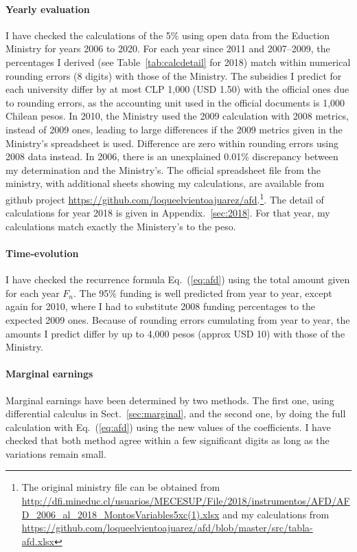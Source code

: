\documentclass[twocolumn]{article}
\def\eqref#1{Eq.~(\ref{eq:#1})}
\begin{document}
\paragraph{Yearly evaluation} I have checked the calculations of the 5\% using open data from the Eduction Ministry for
years 2006 to 2020. For each year since 2011 and 2007--2009, the percentages I
derived (see Table~\ref{tab:calcdetail} for 2018) match within numerical
rounding errors (8 digits) with those of the Ministry. The subsidies I predict
for each university differ by at most CLP 1,000 (USD 1.50) with the
official ones due to rounding errors, as the accounting unit used in the
official documents is 1,000 Chilean pesos. In 2010, the Ministry used the 2009
calculation with 2008 metrics, instead of 2009 ones, leading to large differences if the 2009 metrics given in the Ministry's spreadsheet is used.  Difference are zero within rounding errors using 2008 data instead. In 2006, there is an unexplained 0.01\% discrepancy between my determination and the Ministry's.  The official spreadsheet file from the ministry, with additional sheets showing my calculations, are available from github project \url{https://github.com/loqueelvientoajuarez/afd}.\footnote{The original ministry file can
be obtained from \url{http://dfi.mineduc.cl/usuarios/MECESUP/File/2018/instrumentos/AFD/AFD_2006_al_2018_MontosVariables5xc(1).xlsx} and my calculations from \url{https://github.com/loqueelvientoajuarez/afd/blob/master/src/tabla-afd.xlsx}}. 
The detail of calculations for year 2018 is given in Appendix.~\ref{sec:2018}.
For that year, my calculations match exactly the Ministery's to the peso.

\paragraph{Time-evolution} I have checked the recurrence formula \eqref{afd} using the total amount given for each year $F_n$.  The 95\% funding is well predicted from year to year, except again for 2010, where I had to substitute 2008 funding percentages to the expected 2009 ones. Because of rounding errors cumulating from year to year, the amounts I predict differ by up to 4,000 pesos (approx USD 10) with those of the Ministry.

\paragraph{Marginal earnings}  Marginal earnings have been determined by two methods.  The first one, using differential calculus in Sect.~\ref{sec:marginal}, and the second one, by doing the full calculation with \eqref{afd} using the new values of the coefficients.  I have checked that both method agree within a few significant digits as long as the variations remain small.
\end{document}
